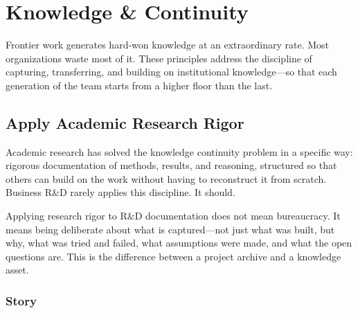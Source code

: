 
\chapter{Knowledge \& Continuity}


Frontier work generates hard-won knowledge at an extraordinary rate.
Most organizations waste most of it. These principles address the discipline
of capturing, transferring, and building on institutional knowledge---so that
each generation of the team starts from a higher floor than the last.

\section{Apply Academic Research Rigor}


Academic research has solved the knowledge continuity problem in a specific way:
rigorous documentation of methods, results, and reasoning, structured so that
others can build on the work without having to reconstruct it from scratch.
Business R\&D rarely applies this discipline. It should.

Applying research rigor to R\&D documentation does not mean bureaucracy.
It means being deliberate about what is captured---not just what was built,
but why, what was tried and failed, what assumptions were made, and what
the open questions are. This is the difference between a project archive
and a knowledge asset.

\subsection{Story}

